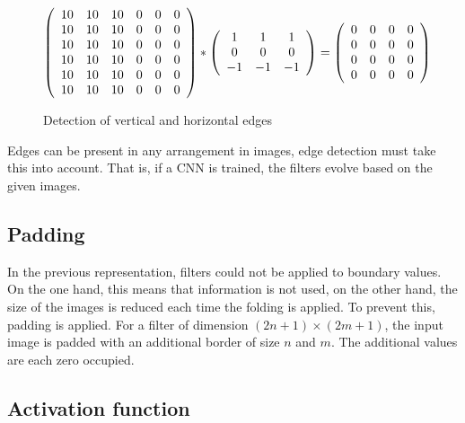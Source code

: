 {\begin{figure}
		$$
		\left(
		\begin{array}{ccc ccc}
			10 & 10 & 10 & 0 & 0 & 0 \\
			10 & 10 & 10 & 0 & 0 & 0 \\
			10 & 10 & 10 & 0 & 0 & 0 \\
			10 & 10 & 10 & 0 & 0 & 0 \\
			10 & 10 & 10 & 0 & 0 & 0 \\
			10 & 10 & 10 & 0 & 0 & 0 \\
		\end{array}
		\right)
		\ast
		\left(
		\begin{array}{ccc}
			1 &  1 &  1 \\
			0 &  0 &  0 \\
			-1 & -1 & -1 \\
		\end{array}
		\right)
		=
		\left(
		\begin{array}{cccc}
			0 & 0 & 0 & 0 \\
			0 & 0 & 0 & 0 \\
			0 & 0 & 0 & 0 \\
			0 & 0 & 0 & 0 \\
		\end{array}
		\right)
		$$
		\caption{Detection of vertical and horizontal edges}
	\end{figure}
	
	Edges can be present in any arrangement in images, edge detection must take this into account. That is, if a CNN is trained, the filters evolve based on the given images. 
	
	
	
	\subsection*{Padding}
	
	In the previous representation, filters could not be applied to boundary values. On the one hand, this means that information is not used, on the other hand, the size of the images is reduced each time the folding is applied. To prevent this, padding is applied. For a filter of dimension $(2n+1) \times (2m+1)$, the input image is padded with an additional border of size
	$n$ and $m$. The additional values are each zero occupied.
	
	
	
	
	
	\subsection*{Activation function}\label{subsec:activation}
	
}
